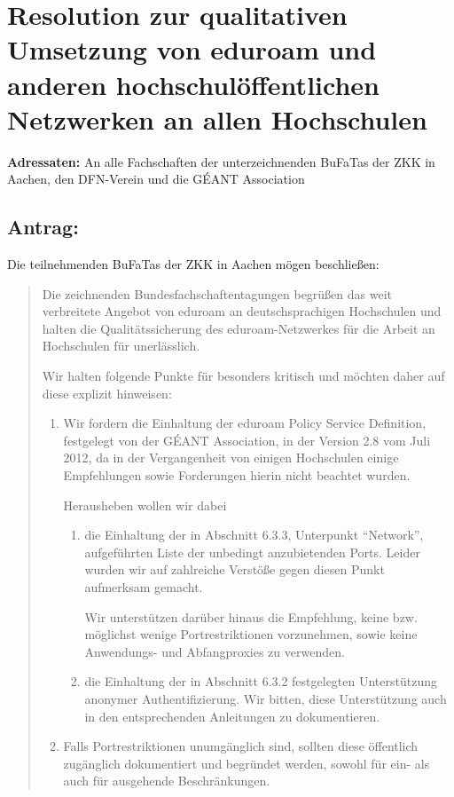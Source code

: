 \documentclass[10pt,oneside]{scrartcl}
\begin{document}
\section*{Resolution zur qualitativen Umsetzung von  eduroam und anderen
  hochschulöffentlichen Netzwerken an allen Hochschulen}

\textbf{Adressaten:} An alle Fachschaften der unterzeichnenden BuFaTas der ZKK
in Aachen, den DFN-Verein und die GÉANT Association

\subsection*{Antrag:}
Die teilnehmenden BuFaTas der ZKK in Aachen mögen beschließen:
\begin{quote}
  Die zeichnenden Bundesfachschaftentagungen begrüßen das weit verbreitete
  Angebot von eduroam an deutschsprachigen Hochschulen und halten die
  Qualitätssicherung des eduroam-Netzwerkes für die Arbeit an Hochschulen für
  unerlässlich.

  Wir halten folgende Punkte für besonders kritisch und möchten daher auf diese
  explizit hinweisen:

  \begin{enumerate}
  \item Wir fordern die Einhaltung der eduroam Policy Service Definition,
    festgelegt von der GÉANT Association, in der Version 2.8 vom Juli 2012, da
    in der Vergangenheit von einigen Hochschulen einige Empfehlungen sowie
    Forderungen hierin nicht beachtet wurden.

    Herausheben wollen wir dabei
    \begin{enumerate}
    \item  die Einhaltung der in Abschnitt 6.3.3, Unterpunkt ``Network'',
      aufgeführten Liste der unbedingt anzubietenden Ports. Leider wurden wir
      auf zahlreiche Verstöße gegen diesen Punkt aufmerksam gemacht.

      Wir unterstützen darüber hinaus die Empfehlung, keine
      bzw. möglichst wenige Portrestriktionen vorzunehmen, sowie keine
      Anwendungs- und Abfangproxies zu verwenden.

    \item die Einhaltung der in Abschnitt 6.3.2 festgelegten Unterstützung
      anonymer Authentifizierung. Wir bitten, diese Unterstützung auch in den
      entsprechenden Anleitungen zu dokumentieren.
    \end{enumerate}
  \item Falls Portrestriktionen unumgänglich sind, sollten diese öffentlich
    zugänglich dokumentiert und begründet werden, sowohl für ein- als auch für
    ausgehende Beschränkungen.


\end{enumerate}
\end{quote}
\end{document}
